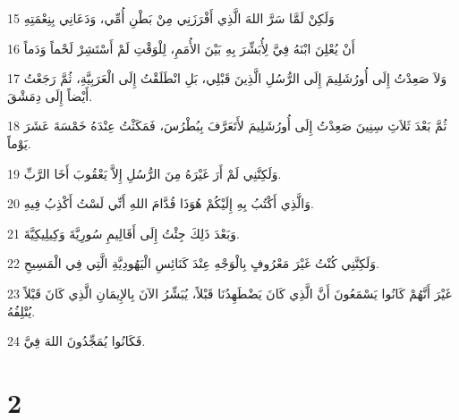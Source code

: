 \par 15 وَلَكِنْ لَمَّا سَرَّ اللهَ الَّذِي أَفْرَزَنِي مِنْ بَطْنِ أُمِّي، وَدَعَانِي بِنِعْمَتِهِ
\par 16 أَنْ يُعْلِنَ ابْنَهُ فِيَّ لِأُبَشِّرَ بِهِ بَيْنَ الأُمَمِ، لِلْوَقْتِ لَمْ أَسْتَشِرْ لَحْماً وَدَماً
\par 17 وَلاَ صَعِدْتُ إِلَى أُورُشَلِيمَ إِلَى الرُّسُلِ الَّذِينَ قَبْلِي، بَلِ انْطَلَقْتُ إِلَى الْعَرَبِيَّةِ، ثُمَّ رَجَعْتُ أَيْضاً إِلَى دِمَشْقَ.
\par 18 ثُمَّ بَعْدَ ثَلاَثِ سِنِينَ صَعِدْتُ إِلَى أُورُشَلِيمَ لأَتَعَرَّفَ بِبُطْرُسَ، فَمَكَثْتُ عِنْدَهُ خَمْسَةَ عَشَرَ يَوْماً.
\par 19 وَلَكِنَّنِي لَمْ أَرَ غَيْرَهُ مِنَ الرُّسُلِ إِلاَّ يَعْقُوبَ أَخَا الرَّبِّ.
\par 20 وَالَّذِي أَكْتُبُ بِهِ إِلَيْكُمْ هُوَذَا قُدَّامَ اللهِ أَنِّي لَسْتُ أَكْذِبُ فِيهِ.
\par 21 وَبَعْدَ ذَلِكَ جِئْتُ إِلَى أَقَالِيمِ سُورِيَّةَ وَكِيلِيكِيَّةَ.
\par 22 وَلَكِنَّنِي كُنْتُ غَيْرَ مَعْرُوفٍ بِالْوَجْهِ عِنْدَ كَنَائِسِ الْيَهُودِيَّةِ الَّتِي فِي الْمَسِيحِ.
\par 23 غَيْرَ أَنَّهُمْ كَانُوا يَسْمَعُونَ أَنَّ الَّذِي كَانَ يَضْطَهِدُنَا قَبْلاً، يُبَشِّرُ الآنَ بِالإِيمَانِ الَّذِي كَانَ قَبْلاً يُتْلِفُهُ.
\par 24 فَكَانُوا يُمَجِّدُونَ اللهَ فِيَّ.

\chapter{2}

